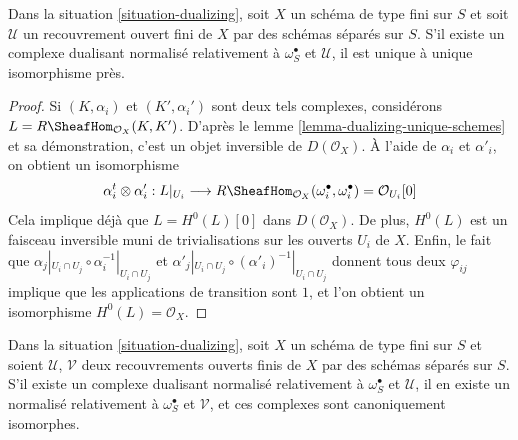 \begin{lemma}
\label{lemma-good-dualizing-unique}
Dans la situation \ref{situation-dualizing}, soit $X$ un schéma de type fini sur $S$ et soit $\mathcal{U}$ un recouvrement ouvert fini de $X$ par des schémas séparés sur $S$. S'il existe un complexe dualisant normalisé relativement à $\omega_S^\bullet$ et $\mathcal{U}$, il est unique à unique isomorphisme près.
\end{lemma}

\begin{proof}
Si $(K, \alpha_i)$ et $(K', \alpha_i')$ sont deux tels complexes, considérons $L = R\SheafHom_{\mathcal{O}_X}(K, K')$. D'après le lemme \ref{lemma-dualizing-unique-schemes} et sa démonstration, c'est un objet inversible de $D(\mathcal{O}_X)$. À l'aide de $\alpha_i$ et $\alpha'_i$, on obtient un isomorphisme
$$
\alpha_i^t \otimes \alpha'_i :
L|_{U_i} \longrightarrow
R\SheafHom_{\mathcal{O}_X}(\omega_i^\bullet, \omega_i^\bullet) =
\mathcal{O}_{U_i}[0]
$$
Cela implique déjà que $L = H^0(L)[0]$ dans $D(\mathcal{O}_X)$. De plus, $H^0(L)$ est un faisceau inversible muni de trivialisations sur les ouverts $U_i$ de $X$. Enfin, le fait que $\alpha_j|_{U_i \cap U_j} \circ \alpha_i^{-1}|_{U_i \cap U_j}$ et $\alpha'_j|_{U_i \cap U_j} \circ (\alpha'_i)^{-1}|_{U_i \cap U_j}$ donnent tous deux $\varphi_{ij}$ implique que les applications de transition sont $1$, et l'on obtient un isomorphisme $H^0(L) = \mathcal{O}_X$.
\end{proof}

\begin{lemma}
\label{lemma-good-dualizing-independence-covering}
Dans la situation \ref{situation-dualizing}, soit $X$ un schéma de type fini sur $S$ et soient $\mathcal{U}$, $\mathcal{V}$ deux recouvrements ouverts finis de $X$ par des schémas séparés sur $S$. S'il existe un complexe dualisant normalisé relativement à $\omega_S^\bullet$ et $\mathcal{U}$, il en existe un normalisé relativement à $\omega_S^\bullet$ et $\mathcal{V}$, et ces complexes sont canoniquement isomorphes.
\end{lemma}

